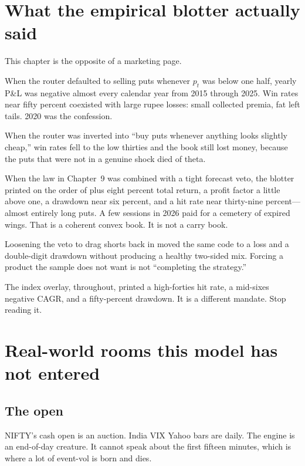 \documentclass[11pt,a4paper]{article}
\begin{document}
\section{What the empirical blotter actually said}
\label{ch:emp}

This chapter is the opposite of a marketing page.

When the router defaulted to selling puts whenever $p_t$ was below one half, yearly P\&L was negative almost every calendar year from 2015 through 2025. Win rates near fifty percent coexisted with large rupee losses: small collected premia, fat left tails. 2020 was the confession.

When the router was inverted into ``buy puts whenever anything looks slightly cheap,'' win rates fell to the low thirties and the book still lost money, because the puts that were not in a genuine shock died of theta.

When the law in Chapter~9 was combined with a tight forecast veto, the blotter printed on the order of plus eight percent total return, a profit factor a little above one, a drawdown near six percent, and a hit rate near thirty-nine percent---almost entirely long puts. A few sessions in 2026 paid for a cemetery of expired wings. That is a coherent convex book. It is not a carry book.

Loosening the veto to drag shorts back in moved the same code to a loss and a double-digit drawdown without producing a healthy two-sided mix. Forcing a product the sample does not want is not ``completing the strategy.''

The index overlay, throughout, printed a high-forties hit rate, a mid-sixes negative CAGR, and a fifty-percent drawdown. It is a different mandate. Stop reading it.

\section{Real-world rooms this model has not entered}
\label{ch:real}

\subsection{The open}

NIFTY's cash open is an auction. India VIX Yahoo bars are daily. The engine is an end-of-day creature. It cannot speak about the first fifteen minutes, which is where a lot of event-vol is born and dies.
\end{document}
